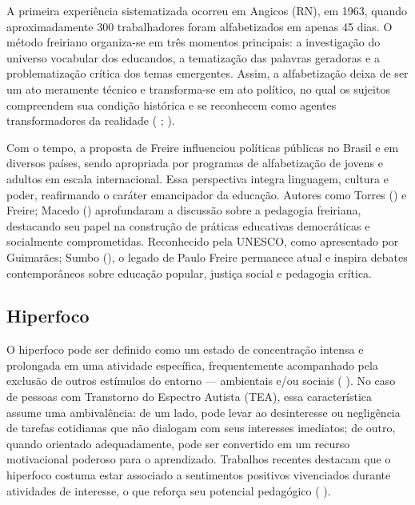 \documentclass[
  12pt,
  a4paper,
]{article}
\begin{document}
A primeira experiência sistematizada ocorreu em Angicos (RN), em 1963,
quando aproximadamente 300 trabalhadores foram alfabetizados em apenas
45 dias. O método freiriano organiza-se em três momentos principais: a
investigação do universo vocabular dos educandos, a tematização das
palavras geradoras e a problematização crítica dos temas emergentes.
Assim, a alfabetização deixa de ser um ato meramente técnico e
transforma-se em ato político, no qual os sujeitos compreendem sua
condição histórica e se reconhecem como agentes transformadores da
realidade ( ;
).

Com o tempo, a proposta de Freire influenciou políticas públicas no
Brasil e em diversos países, sendo apropriada por programas de
alfabetização de jovens e adultos em escala internacional. Essa
perspectiva integra linguagem, cultura e poder, reafirmando o caráter
emancipador da educação. Autores como Torres
() e Freire; Macedo
() aprofundaram a discussão sobre a
pedagogia freiriana, destacando seu papel na construção de práticas
educativas democráticas e socialmente comprometidas. Reconhecido pela
UNESCO, como apresentado por Guimarães; Sumbo
(), o legado de Paulo Freire permanece
atual e inspira debates contemporâneos sobre educação popular, justiça
social e pedagogia crítica.

\subsection{Hiperfoco}\label{hiperfoco}

O hiperfoco pode ser definido como um estado de concentração intensa e
prolongada em uma atividade específica, frequentemente acompanhado pela
exclusão de outros estímulos do entorno --- ambientais e/ou sociais
( ). No caso de
pessoas com Transtorno do Espectro Autista (TEA), essa característica
assume uma ambivalência: de um lado, pode levar ao desinteresse ou
negligência de tarefas cotidianas que não dialogam com seus interesses
imediatos; de outro, quando orientado adequadamente, pode ser convertido
em um recurso motivacional poderoso para o aprendizado. Trabalhos
recentes destacam que o hiperfoco costuma estar associado a sentimentos
positivos vivenciados durante atividades de interesse, o que reforça seu
potencial pedagógico (
).
\end{document}
